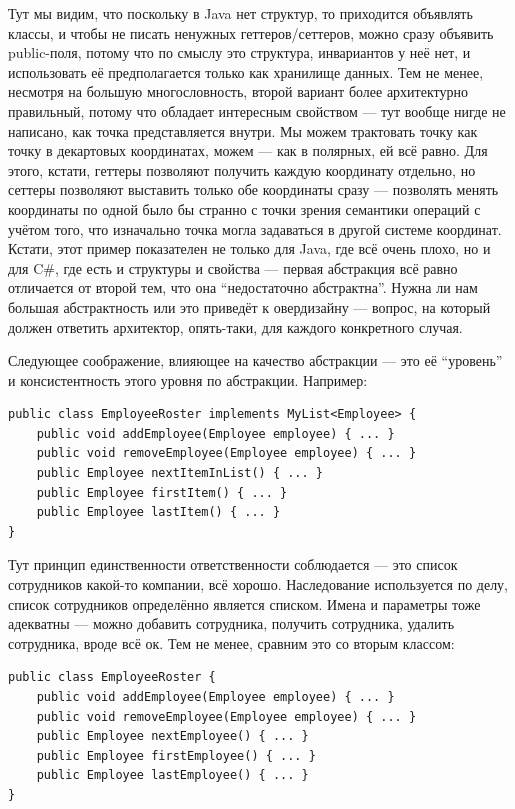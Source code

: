 \documentclass{../../text-style}
\begin{document}
Тут мы видим, что поскольку в Java нет структур, то приходится объявлять классы, и чтобы не писать ненужных геттеров/сеттеров, можно сразу объявить public-поля, потому что по смыслу это структура, инвариантов у неё нет, и использовать её предполагается только как хранилище данных. Тем не менее, несмотря на большую многословность, второй вариант более архитектурно правильный, потому что обладает интересным свойством --- тут вообще нигде не написано, как точка представляется внутри. Мы можем трактовать точку как точку в декартовых координатах, можем --- как в полярных, ей всё равно. Для этого, кстати, геттеры позволяют получить каждую координату отдельно, но сеттеры позволяют выставить только обе координаты сразу --- позволять менять координаты по одной было бы странно с точки зрения семантики операций с учётом того, что изначально точка могла задаваться в другой системе координат. Кстати, этот пример показателен не только для Java, где всё очень плохо, но и для C\#, где есть и структуры и свойства --- первая абстракция всё равно отличается от второй тем, что она ``недостаточно абстрактна''. Нужна ли нам большая абстрактность или это приведёт к овердизайну --- вопрос, на который должен ответить архитектор, опять-таки, для каждого конкретного случая.

Следующее соображение, влияющее на качество абстракции --- это её ``уровень'' и консистентность этого уровня по абстракции. Например:

\begin{verbatim}
public class EmployeeRoster implements MyList<Employee> {
    public void addEmployee(Employee employee) { ... }
    public void removeEmployee(Employee employee) { ... }
    public Employee nextItemInList() { ... }
    public Employee firstItem() { ... }
    public Employee lastItem() { ... }
}
\end{verbatim}

Тут принцип единственности ответственности соблюдается --- это список сотрудников какой-то компании, всё хорошо. Наследование используется по делу, список сотрудников определённо является списком. Имена и параметры тоже адекватны --- можно добавить сотрудника, получить сотрудника, удалить сотрудника, вроде всё ок. Тем не менее, сравним это со вторым классом:

\begin{verbatim}
public class EmployeeRoster {
    public void addEmployee(Employee employee) { ... }
    public void removeEmployee(Employee employee) { ... }
    public Employee nextEmployee() { ... }
    public Employee firstEmployee() { ... }
    public Employee lastEmployee() { ... }
}
\end{verbatim}
\end{document}
